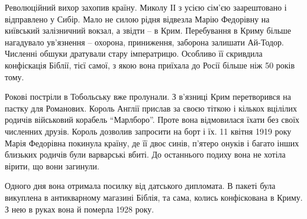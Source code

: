 Революційний вихор захопив країну. Миколу ІІ з усією сім’єю заарештовано і
відправлено у Сибір. Мало не силою рідня відвезла Марію Федорівну на київський
залізничний вокзал, а звідти – в Крим. Перебування в Криму більше нагадувало
ув’язнення – охорона, приниження, заборона залишати Ай-Тодор. Численні обшуки
дратували стару імператрицю. Особливо її скривдила конфіскація Біблії, тієї
самої, з якою вона приїхала до Росії більше ніж 50 років тому. 

Рокові постріли в Тобольську вже пролунали. З в’язниці Крим перетворився на
пастку для Романових. Король Англії прислав за своєю тіткою і кількох вцілілих
родичів військовий корабель \enquote{Марлборо}. Проте вона відмовилася їхати без своїх
численних друзів. Король дозволив запросити на борт і їх. 11 квітня 1919 року
Марія Федорівна покинула країну, де її двоє синів, п’ятеро онуків і багато
інших близьких родичів були варварські вбиті. До останнього подиху вона не
хотіла вірити, що вони загинули.    

Одного дня вона отримала посилку від датського дипломата. В пакеті була
викуплена в антикварному магазині Біблія, та сама, колись конфіскована в Криму.
З нею в руках вона й померла 1928 року.
